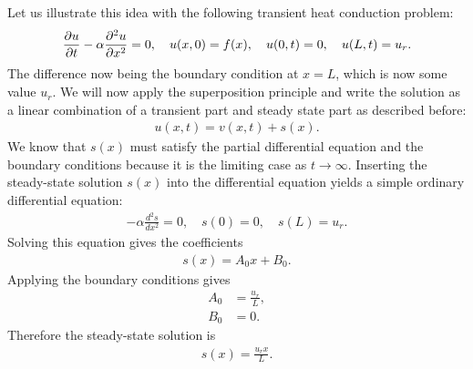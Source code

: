 Let us illustrate this idea with the following transient heat conduction problem:
\begin{align}
  \frac{ \partial {u} }{ \partial {t} } - \alpha \frac{ \partial^2 {u} }{ \partial {x}^2 } = 0, \quad u(x,0) = f(x), \quad u(0,t) = 0, \quad u(L,t) = u_r .
\end{align}
The difference now being the boundary condition at $x = L$, which is now some value $u_r$. We will now apply the superposition principle and write the solution as a linear combination of  a transient part and steady state part as described before:
\begin{align}
  u(x,t) = v(x,t) + s(x) . \nonumber
\end{align}
We know that $s(x)$ must satisfy the partial differential equation and the boundary conditions because it is the limiting case as $t \rightarrow \infty$. Inserting the steady-state solution $s(x)$ into the differential equation yields a simple ordinary differential equation:
\begin{align}
  -\alpha \frac{d^2 s}{dx^2} = 0, \quad s(0) = 0, \quad s(L) = u_r .
\end{align}
Solving this equation gives the coefficients
\begin{align}
  s(x) = A_0 x + B_0 .
\end{align}
Applying the boundary conditions gives 
\begin{subequations}
\begin{align}
  A_0 &= \frac{u_r}{L} , \\
  B_0 &= 0.
\end{align}
\end{subequations}
Therefore the steady-state solution is
\begin{align}
  s(x) = \frac{u_r x}{L} .
\end{align}

